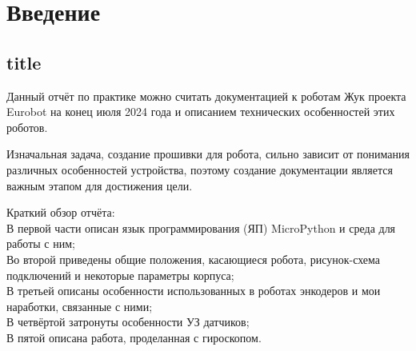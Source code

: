 \chapter*{Введение}
\section*{title}
Данный отчёт по практике можно считать документацией к роботам Жук проекта Eurobot на конец июля 2024 года и описанием технических особенностей этих роботов.

Изначальная задача, создание прошивки для робота, сильно зависит от понимания различных особенностей устройства, поэтому создание документации является важным этапом для достижения цели.

Краткий обзор отчёта:\\
В первой части описан язык программирования (ЯП) MicroPython и среда для работы с ним;\\
Во второй приведены общие положения, касающиеся робота, рисунок-схема подключений и некоторые параметры корпуса;\\
В третьей описаны особенности использованных в роботах энкодеров и мои наработки, связанные с ними;\\
В четвёртой затронуты особенности УЗ датчиков;\\
В пятой описана работа, проделанная с гироскопом.
